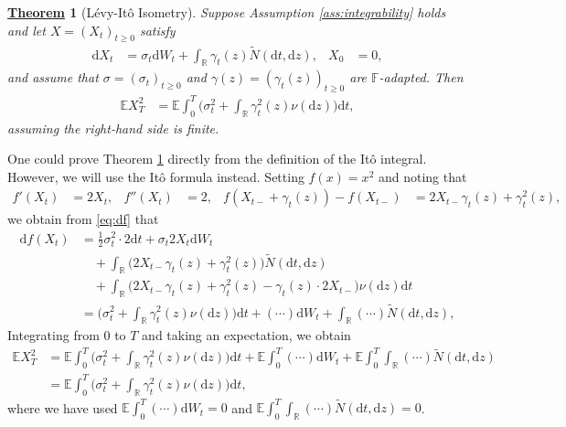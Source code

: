 \documentclass[12pt]{book}
\numberwithin{equation}{chapter}
\theoremstyle{plain}
\newtheorem{theorem}{\underline{Theorem}}
\numberwithin{theorem}{section}
\theoremstyle{definition}
\numberwithin{exercise}{chapter}
\let\oldendproof\endproof
\renewenvironment{proof}[1][\proofname]{%
  \oldproof[\scshape\underline{#1}]%
}{\oldendproof}
\newcommand{\<}{\langle}
\renewcommand{\>}{\rangle}
\renewcommand{\(}{\left(}
\renewcommand{\)}{\right)}
\renewcommand{\[}{\left[}
\renewcommand{\]}{\right]}
\newcommand\Eb{\mathds{E}}
\newcommand\Fb{\mathds{F}}
\newcommand\Rb{\mathds{R}}
\newcommand\sig{\sigma}
\newcommand\gam{\gamma}
\newcommand\Nt{\widetilde{N}}
\newcommand\dd{\mathrm{d}}
\begin{document}
\begin{theorem}[L\'evy-It\^o Isometry]
\label{thm:isometry}
Suppose Assumption \ref{ass:integrability} holds and let $X = (X_t)_{t \geq 0}$ satisfy
\begin{align}
\dd X_t
	&=	\sig_t \dd W_t + \int_\Rb \gam_t(z) \Nt( \dd t , \dd z ) , &
X_0
	&=	0 ,
\end{align}
and assume that $\sig = (\sig_t)_{t \geq 0}$ and $\gam(z) = (\gam_t(z))_{t \geq 0}$ are $\Fb$-adapted.  Then
\begin{align}
\Eb X_T^2
	&=	\Eb \int_0^T \Big( \sig_t^2 + \int_\Rb \gam_t^2(z) \nu(\dd z) \Big) \dd t ,
\end{align}
assuming the right-hand side is finite.
\end{theorem}

\begin{proof}
One could prove Theorem \ref{thm:isometry} directly from the definition of the It\^o integral.  However, we will use the It\^o formula instead.  Setting $f(x) = x^2$ and noting that
\begin{align}
f'(X_t)
	&=	2 X_t , &
f''(X_t) 
	&=	2 , &
f(X_{t-} + \gam_t(z)) - f(X_{t-})
	&=	2 X_{t-} \gam_t(z) + \gam_t^2(z) ,
\end{align}
we obtain from \eqref{eq:df} that
\begin{align}
\dd f(X_t)
	&=	\tfrac{1}{2} \sig_t^2 \cdot 2 \dd t 
			+ \sig_t 2 X_t \dd W_t \\ &\quad
			+	\int_\Rb \Big( 2 X_{t-} \gam_t(z) + \gam_t^2(z) \Big) \Nt( \dd t, \dd z) \\ &\quad
			+	\int_\Rb \Big( 2 X_{t-} \gam_t(z) + \gam_t^2(z) - \gam_{t}(z) \cdot 2 X_{t-} \Big) \nu(\dd z) \dd t \\
	&=	\Big( \sig_t^2 + 	\int_\Rb \gam_t^2(z) \nu(\dd z) \Big) \dd t  + (\cdots) \dd W_t + \int_\Rb (\cdots ) \Nt( \dd t, \dd z) ,
\end{align}
Integrating from $0$ to $T$ and taking an expectation, we obtain
\begin{align}
\Eb X_T^2
	&=	\Eb \int_0^T \Big( \sig_t^2 + 	\int_\Rb \gam_t^2(z) \nu(\dd z) \Big) \dd t 
			+ \Eb \int_0^T (\cdots) \dd W_t + \Eb \int_0^T \int_\Rb (\cdots ) \Nt( \dd t, \dd z) \\
	&=	\Eb \int_0^T \Big( \sig_t^2 + 	\int_\Rb \gam_t^2(z) \nu(\dd z) \Big) \dd t ,
\end{align}
where we have used $\Eb \int_0^T (\cdots) \dd W_t=0$ and $\Eb \int_0^T \int_\Rb (\cdots ) \Nt( \dd t, \dd z)=0$.
\end{proof}
\end{document}
